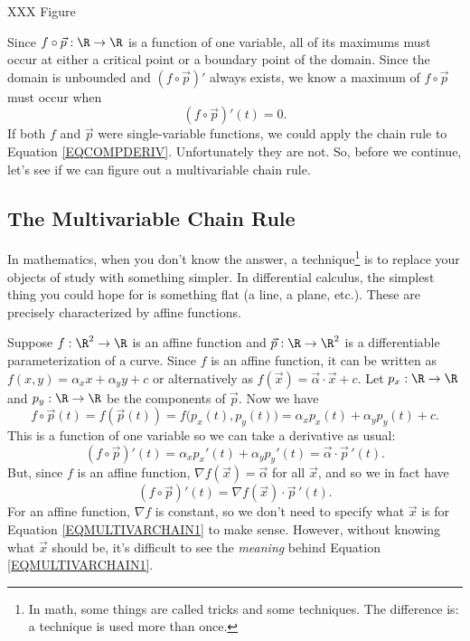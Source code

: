 XXX Figure

Since $f\circ \vec p:\R\to\R$ is a function of one variable, all of its maximums
must occur at either a critical point or a boundary point of the domain.  Since
the domain is unbounded and $(f\circ \vec p)'$ always exists, we know a maximum
of $f\circ \vec p$ must occur when
\begin{equation}
	\label{EQCOMPDERIV}
	(f\circ\vec p)'(t)=0.
\end{equation}
If both $f$ and $\vec p$ were single-variable functions, we could
apply the chain rule to Equation \eqref{EQCOMPDERIV}.  Unfortunately they
are not.  So, before we continue, let's see if we can figure out a multivariable
chain rule.

\subsection{The Multivariable Chain Rule}

In mathematics, when you don't know the answer, a technique\footnote{
In math, some things are called tricks and some techniques.  The difference is:
a technique is used more than once.} is to
replace your objects of study with something simpler.  In differential calculus,
the simplest thing you could hope for is something flat (a line, a plane, etc.).
These are precisely characterized by affine functions.

Suppose $f:\R^2\to\R$ is an affine function and $\vec p:\R\to\R^2$ is a differentiable
parameterization of a curve.  Since $f$ is an affine function, it can be written
as $f(x,y)=\alpha_x x+\alpha_y y+c$ or alternatively as
$f(\vec x) = \vec \alpha\cdot \vec x+c$.  Let $p_x:\R\to\R$ and $p_y:\R\to\R$ be the components
of $\vec p$.  Now we have
\[
	f\circ \vec p(t) = f(\vec p(t)) = f\big(p_x(t),p_y(t)\big)=\alpha_xp_x(t)+\alpha_yp_y(t)+c.
\]
This is a function of one variable so we can take a derivative as usual:
\[
	(f\circ\vec p)'(t) = \alpha_xp_x'(t)+\alpha_yp_y'(t) = \vec \alpha\cdot \vec p\,'(t).
\]
But, since $f$ is an affine function, $\nabla f(\vec x)=\vec \alpha$ for
all $\vec x$, and so we in fact have
\begin{equation}
	\label{EQMULTIVARCHAIN1}
	(f\circ\vec p)'(t) = \nabla f(\vec x)\cdot \vec p\,'(t).
\end{equation}
For an affine function, $\nabla f$ is constant, so we don't need to specify what
$\vec x$ is for Equation \eqref{EQMULTIVARCHAIN1} to make sense.  However, without
knowing what $\vec x$ should be, it's difficult to see the \emph{meaning} behind
Equation \eqref{EQMULTIVARCHAIN1}.

